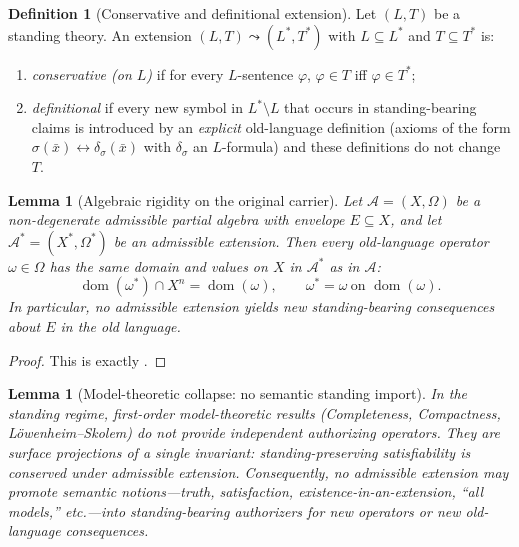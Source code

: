 \documentclass[11pt]{article}
\newtheorem{lemma}[theorem]{Lemma}
\theoremstyle{definition}
\newtheorem{definition}[theorem]{Definition}
\newcommand{\pdom}{\operatorname{dom}}
\begin{document}
\begin{definition}[Conservative and definitional extension]
Let $(L,T)$ be a standing theory.
An extension $(L,T)\leadsto(L^*,T^*)$ with $L\subseteq L^*$ and $T\subseteq T^*$ is:
\begin{enumerate}[label=(\alph*), leftmargin=2.0em]
\item \emph{conservative (on $L$)} if for every $L$-sentence $\varphi$, $\varphi\in T$ iff $\varphi\in T^*$;
\item \emph{definitional} if every new symbol in $L^*\setminus L$ that occurs in standing-bearing claims is introduced by an \emph{explicit} old-language definition (axioms of the form $\sigma(\bar x)\leftrightarrow \delta_\sigma(\bar x)$ with $\delta_\sigma$ an $L$-formula) and these definitions do not change $T$.
\end{enumerate}
\end{definition}

\begin{lemma}[Algebraic rigidity on the original carrier]
\label{lem:algebraic-rigidity}
Let $\mathcal{A}=(X,\Omega)$ be a non-degenerate admissible partial algebra with envelope $E\subseteq X$, and let $\mathcal{A}^*=(X^*,\Omega^*)$ be an admissible extension.
Then every old-language operator $\omega\in\Omega$ has the same domain and values on $X$ in $\mathcal{A}^*$ as in $\mathcal{A}$:
\[
\pdom(\omega^*)\cap X^n=\pdom(\omega),\qquad \omega^*=\omega\ \text{on }\pdom(\omega).
\]
In particular, no admissible extension yields new standing-bearing consequences about $E$ in the old language.
\end{lemma}

\begin{proof}
This is exactly .
\end{proof}

\begin{lemma}[Model-theoretic collapse: no semantic standing import]
\label{lem:no-semantic-import}
In the standing regime, first-order model-theoretic results (Completeness, Compactness, L{\"o}wenheim--Skolem) do not provide independent authorizing operators.
They are surface projections of a single invariant: \emph{standing-preserving satisfiability is conserved under admissible extension}.
Consequently, no admissible extension may promote semantic notions---truth, satisfaction, existence-in-an-extension, ``all models,'' etc.---into standing-bearing authorizers for new operators or new old-language consequences.
\end{lemma}
\end{document}
